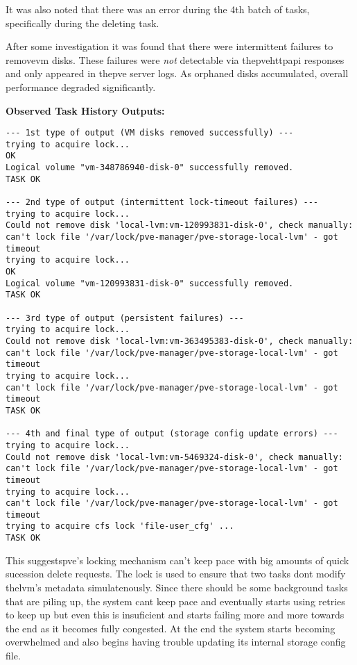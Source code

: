         It was also noted that there was an error during the 4th batch of tasks, specifically during the deleting task.

        After some investigation it was found that there were intermittent failures to remove\ac{vm} disks. These failures 
        were \emph{not} detectable via the\ac{pve}\ac{http}\ac{api} responses and only appeared in the\ac{pve} server 
        logs. As orphaned disks accumulated, overall performance degraded significantly.

        \medskip
        \noindent\textbf{Observed Task History Outputs:}
        \begin{verbatim}
--- 1st type of output (VM disks removed successfully) ---
trying to acquire lock...
OK
Logical volume "vm-348786940-disk-0" successfully removed.
TASK OK

--- 2nd type of output (intermittent lock-timeout failures) ---
trying to acquire lock...
Could not remove disk 'local-lvm:vm-120993831-disk-0', check manually:
can't lock file '/var/lock/pve-manager/pve-storage-local-lvm' - got timeout
trying to acquire lock...
OK
Logical volume "vm-120993831-disk-0" successfully removed.
TASK OK

--- 3rd type of output (persistent failures) ---
trying to acquire lock...
Could not remove disk 'local-lvm:vm-363495383-disk-0', check manually:
can't lock file '/var/lock/pve-manager/pve-storage-local-lvm' - got timeout
trying to acquire lock...
can't lock file '/var/lock/pve-manager/pve-storage-local-lvm' - got timeout
TASK OK

--- 4th and final type of output (storage config update errors) ---
trying to acquire lock...
Could not remove disk 'local-lvm:vm-5469324-disk-0', check manually:
can't lock file '/var/lock/pve-manager/pve-storage-local-lvm' - got timeout
trying to acquire lock...
can't lock file '/var/lock/pve-manager/pve-storage-local-lvm' - got timeout
trying to acquire cfs lock 'file-user_cfg' ...
TASK OK
        \end{verbatim}

        This suggests\ac{pve}'s locking mechanism can't keep pace with big amounts of quick sucession delete requests. 
        The lock is used to ensure that two tasks dont modify the\ac{lvm}'s metadata simulatenously. Since there should be 
        some background tasks that are piling up, the system cant keep pace and eventually starts using retries to keep 
        up but even this is insuficient and starts failing more and more towards the end as it becomes fully congested. 
        At the end the system starts becoming overwhelmed and also begins having trouble updating its internal storage 
        config file.  

